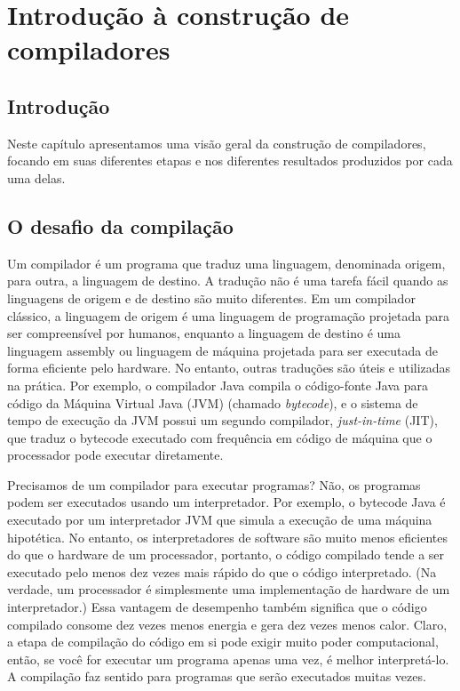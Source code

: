 \chapter{Introdução à construção de compiladores}

\section{Introdução}

Neste capítulo apresentamos uma visão geral da construção
de compiladores, focando em suas diferentes etapas e nos
diferentes resultados produzidos por cada uma delas.

\section{O desafio da compilação}

Um compilador é um programa que traduz uma linguagem,
denominada origem, para outra, a linguagem de destino.
A tradução não é uma tarefa fácil quando as linguagens
de origem e de destino são muito diferentes. Em um compilador
clássico, a linguagem de origem é uma linguagem de
programação projetada para ser compreensível por humanos,
enquanto a linguagem de destino é uma linguagem assembly
ou linguagem de máquina projetada para ser executada de
forma eficiente pelo hardware. No entanto, outras traduções
são úteis e utilizadas na prática. Por exemplo, o compilador
Java compila o código-fonte Java para código da Máquina
Virtual Java (JVM) (chamado \emph{bytecode}), e o sistema
de tempo de execução da JVM possui um segundo compilador,
\emph{just-in-time} (JIT), que traduz o bytecode executado
com frequência em código de máquina que o processador pode
executar diretamente.

Precisamos de um compilador para executar programas? Não,
os programas podem ser executados usando um interpretador.
Por exemplo, o bytecode Java é executado por um interpretador
JVM que simula a execução de uma máquina hipotética. No
entanto, os interpretadores de software são muito menos
eficientes do que o hardware de um processador, portanto, o
código compilado tende a ser executado pelo menos dez vezes
mais rápido do que o código interpretado. (Na verdade, um
  processador é simplesmente uma implementação de hardware
de um interpretador.) Essa vantagem de desempenho também
significa que o código compilado consome dez vezes menos
energia e gera dez vezes menos calor. Claro, a etapa de
compilação do código em si pode exigir muito poder
computacional, então, se você for executar um programa
apenas uma vez, é melhor interpretá-lo. A compilação faz
sentido para programas que serão executados muitas vezes.

